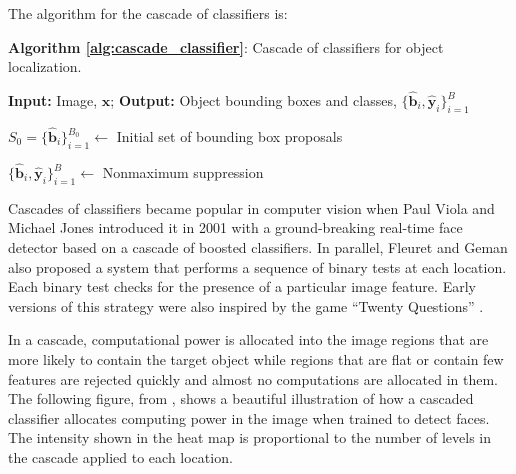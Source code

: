 The algorithm for the cascade of classifiers is:

\begin{algorithm}[h]
\SetAlgoVlined
\DontPrintSemicolon
\caption{{\bf Algorithm \ref{alg:cascade_classifier}}: Cascade of classifiers for object localization.}
\fakealgorithmcaption{}
\label{alg:cascade_classifier}
{\bf Input:} Image, $\mathbf{x}$;
{\bf Output:} Object bounding boxes and classes, $\{\hat{\mathbf{b}}_i, \hat{\mathbf{y}}_i\}_{i=1}^B$\;

$S_0 = \{\hat{\mathbf{b}}_i\}_{i=1}^{B_0} \leftarrow$ Initial set of bounding box proposals\;

$\{\hat{\mathbf{b}}_i, \hat{\mathbf{y}}_i\}_{i=1}^B \leftarrow$ Nonmaximum suppression\;
\end{algorithm}

Cascades of classifiers became popular in computer vision when Paul Viola and Michael Jones \cite{Viola01} introduced it in 2001 with a ground-breaking real-time face detector based on a cascade of boosted classifiers. In parallel, Fleuret and Geman \cite{Fleuret2001} also proposed a system that performs a sequence of binary tests at each location. Each binary test checks for the presence of a particular image feature. Early versions of this strategy were also inspired by the game ``Twenty Questions''  \cite{Geman1994}. 

In a cascade, computational power is allocated into the image regions that are more likely to contain the target object while regions that are flat or contain few features are rejected quickly and almost no computations are allocated in them. The following figure, from \cite{Fleuret2001}, shows a beautiful illustration of how a cascaded classifier allocates computing power in the image when trained to detect faces. The intensity shown in the heat map is proportional to the number of levels in the cascade applied to each location.

